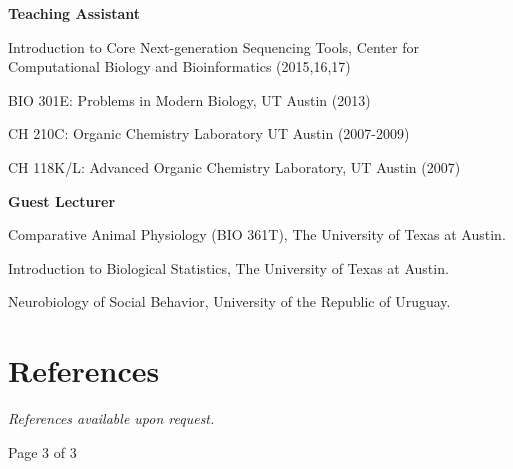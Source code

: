 \documentclass[margin,line]{resume}
\begin{document}
\begin{resume}
{\bf Teaching Assistant}
\begin{list1}
\item[] Introduction to Core Next-generation Sequencing Tools, Center for Computational Biology and Bioinformatics (2015,16,17)
\item[] BIO 301E: Problems in Modern Biology, UT Austin (2013)
\item[] CH 210C: Organic Chemistry Laboratory UT Austin (2007-2009)
\item[] CH 118K/L: Advanced Organic Chemistry Laboratory, UT Austin (2007)
\end{list1}

{\bf Guest Lecturer}
\begin{list1}
\item[] Comparative Animal Physiology (BIO 361T), The University of Texas at Austin. 
\item[] Introduction to Biological Statistics, The University of Texas at Austin.  
\item[] Neurobiology of Social Behavior, University of the Republic of Uruguay. 
\end{list1}

\section{\mysidestyle References}

{\em References available upon request.}


\vspace{2.5 cm}
{\centerline {Page 3 of 3}}

\end{resume}
\end{document}
